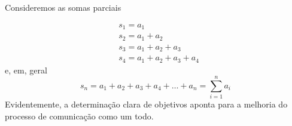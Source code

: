 \begin{apendicesenv}
    Consideremos as somas parciais

    \begin{align*}
         & s_1 = a_1                   \\
         & s_2 = a_1 + a_2             \\
         & s_3 = a_1 + a_2 + a_3       \\
         & s_4 = a_1 + a_2 + a_3 + a_4
    \end{align*}
    e, em, geral
    \[
        s_n = a_1 + a_2 + a_3 + a_4 + \dots + a_n
        = \sum_{i=1}^{n} a_i
    \]
    Evidentemente, a determinação
    clara de objetivos aponta para a melhoria do processo de comunicação como um
    todo.

\end{apendicesenv}
